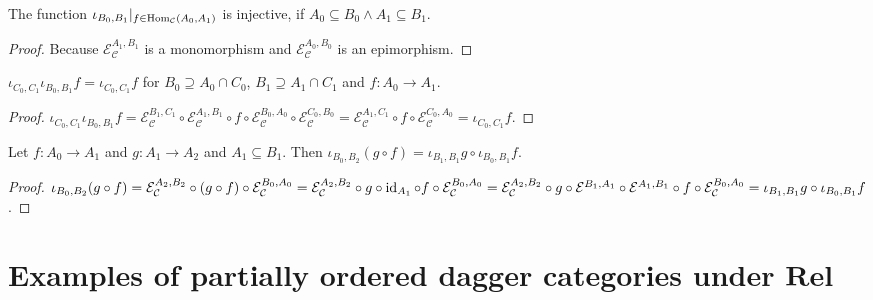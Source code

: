 \begin{prop}
  The function $\iota_{B_0, B_1} |_{f \in \operatorname{Hom}_{\mathcal{C}} (A_0 ,
  A_1)}$ is injective, if $A_0 \subseteq B_0 \wedge A_1 \subseteq B_1$.
\end{prop}

\begin{proof}
  Because $\mathcal{E}_{\mathcal{C}}^{A_1,B_1}$ is a monomorphism and $\mathcal{E}_{\mathcal{C}}^{A_0,B_0}$ is an epimorphism.
\end{proof}

\begin{prop}
  $\iota_{C_0, C_1} \iota_{B_0, B_1} f = \iota_{C_0, C_1} f$ for $B_0
  \supseteq A_0 \cap C_0$, $B_1 \supseteq A_1 \cap C_1$ and $f : A_0
  \rightarrow A_1$.
\end{prop}

\begin{proof}
  $\iota_{C_0, C_1} \iota_{B_0, B_1} f = \mathcal{E}_{\mathcal{C}}^{B_1,C_1}
  \circ \mathcal{E}_{\mathcal{C}}^{A_1,B_1} \circ f \circ \mathcal{E}_{\mathcal{C}}^{B_0,A_0} \circ
  \mathcal{E}_{\mathcal{C}}^{C_0,B_0} = \mathcal{E}_{\mathcal{C}}^{A_1,C_1} \circ f \circ \mathcal{E}_{\mathcal{C}}^{C_0,A_0} =
  \iota_{C_0,C_1} f$.
\end{proof}

\begin{prop}
  Let $f : A_0 \rightarrow A_1$ and $g : A_1 \rightarrow A_2$ and $A_1
  \subseteq B_1$. Then $\iota_{B_0, B_2} (g \circ f) = \iota_{B_1, B_1} g
  \circ \iota_{B_0, B_1} f$.
\end{prop}

\begin{proof}
  $\iota_{B_0, B_2} (g \circ f) = \mathcal{E}_{\mathcal{C}}^{A_2,B_2}
  \circ (g \circ f) \circ \mathcal{E}_{\mathcal{C}}^{B_0,A_0} = \mathcal{E}_{\mathcal{C}}^{A_2,B_2} \circ g \circ \operatorname{id}_{A_1} \circ f
  \circ \mathcal{E}_{\mathcal{C}}^{B_0,A_0} = \mathcal{E}_{\mathcal{C}}^{A_2,B_2} \circ g \circ \mathcal{E}^{B_1,A_1}
  \circ \mathcal{E}^{A_1,B_1} \circ f \circ \mathcal{E}_{\mathcal{C}}^{B_0,A_0} = \iota_{B_1, B_1} g \circ \iota_{B_0,
  B_1} f$.
\end{proof}

\section{\texorpdfstring{Examples of partially ordered dagger categories under
$\mathbf{Rel}$}{Examples of partially ordered dagger categories under Rel}}

